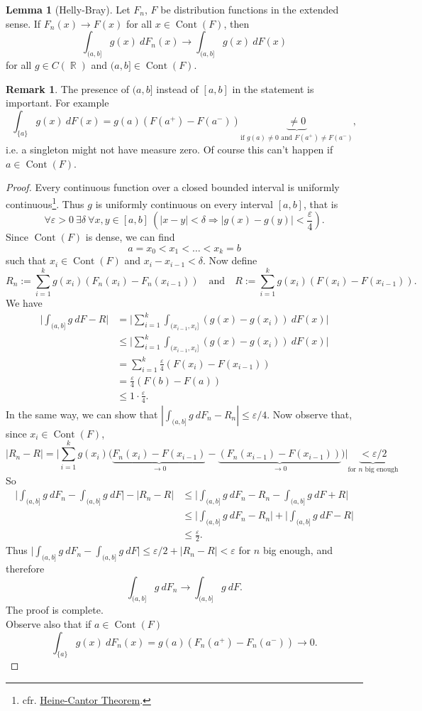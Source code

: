 \documentclass[12pt,a4paper]{report}
\theoremstyle{definition}
\newtheorem{lemma}[theorem]{Lemma}
\newtheorem*{remark}{Remark}
\theoremstyle{num.custom-title}
\DeclareMathOperator{\R}{\mathbb{R}}
\DeclareMathOperator{\imp}{\Rightarrow}
\DeclareMathOperator{\Cont}{Cont}
\renewcommand{\epsilon}{\varepsilon}
\renewcommand{\1}{\mathbbm{1}}
\begin{document}
\begin{lemma}[Helly-Bray]
Let $F_n$, $F$ be distribution functions in the extended sense. If $F_n(x) \to F(x)$ for all $x \in \Cont(F)$, then
\[
\int_{(a,b]} g(x) \ dF_n(x) \to \int_{(a,b]} g(x) \ dF(x)
\]
for all $g \in C(\R)$ and $(a,b] \in \Cont(F)$.
\begin{remark}
The presence of $(a,b]$ instead of $[a,b]$ in the statement is important. For example
\[
\int_{\{a\}} g(x) \ dF(x) = g(a) (F(a^+)-F(a^-)) \underbrace{\neq 0}_{\text{if $g(a) \neq 0$ and $F(a^+) \neq F(a^-)$}},
\]
i.e. a singleton might not have measure zero. Of course this can't happen if $a \in \Cont(F)$.
\end{remark}
\begin{proof}
Every continuous function over a closed bounded interval is uniformly continuous\footnote{cfr. \href{http://en.wikipedia.org/wiki/Heine-Cantor_theorem}{Heine-Cantor Theorem}.}. Thus $g$ is uniformly continuous on every interval $[a,b]$, that is
\[
\forall \epsilon>0 \ \exists \delta \ \forall x,y \in [a,b] \ \left( |x-y|<\delta \imp |g(x)-g(y)|<\frac{\epsilon}{4} \right). \tag{$*$}
\]
Since $\Cont(F)$ is dense, we can find
\[
a = x_0 < x_1 < \ldots < x_k = b
\]
such that $x_i \in \Cont(F)$ and $x_i - x_{i-1} < \delta$.
Now define
\[
R_n := \sum_{i=1}^k g(x_i) (F_n(x_i)-F_n(x_{i-1})) \quad \text{and} \quad R := \sum_{i=1}^k g(x_i) (F(x_i)-F(x_{i-1})).
\]
We have
\begin{align*}
\Big| \int_{(a,b]} g \ dF - R \Big|
&= \Big| \sum_{i=1}^k \int_{(x_{i-1},x_i]} (g(x)-g(x_i)) \ dF(x) \Big| \\
&\leq \Big| \sum_{i=1}^k \int_{(x_{i-1},x_i]} (g(x)-g(x_i)) \ dF(x) \Big| \tag{by $(*)$}\\
&= \sum_{i=1}^k \frac{\epsilon}{4} (F(x_i)-F(x_{i-1})) \\
&= \frac{\epsilon}{4} (F(b)-F(a)) \\
&\leq 1 \cdot \frac{\epsilon}{4}. \tag{because $F$ distr. fun. in the ext. sense}
\end{align*}
In the same way, we can show that $|\int_{(a,b]} g \ dF_n - R_n| \leq \epsilon/4$. Now observe that, since $x_i \in \Cont(F)$,
\[
|R_n-R| = \Big| \sum_{i=1}^k g(x_i) \Big( \underbrace{F_n(x_i)-F(x_{i-1})}_{\to 0} - \underbrace{(F_n(x_{i-1}) -F(x_{i-1}))}_{\to 0} \Big) \Big| \underbrace{< \epsilon/2}_{\text{for $n$ big enough}}
\]
So 
\begin{align*}
\Big| \int_{(a,b]} g \ dF_n - \int_{(a,b]} g \ dF \Big| - |R_n - R| &\leq \Big| \int_{(a,b]} g \ dF_n - R_n - \int_{(a,b]} g \ dF + R \Big| \\
&\leq \Big| \int_{(a,b]} g \ dF_n - R_n \Big| + \Big| \int_{(a,b]} g \ dF - R \Big| \\
&\leq \frac{\epsilon}{2}.
\end{align*}
Thus $\Big| \int_{(a,b]} g \ dF_n - \int_{(a,b]} g \ dF \Big| \leq \epsilon/2 + |R_n - R| < \epsilon$ for $n$ big enough, and therefore
\[
\int_{(a,b]} g \ dF_n \to \int_{(a,b]} g \ dF.
\]
The proof is complete.\\
Observe also that if $a \in \Cont(F)$
\[
\int_{\{a\}} g(x) \ dF_n(x) = g(a) (F_n(a^+)-F_n(a^-)) \to 0.
\]
\end{proof}
\end{lemma}
\end{document}
